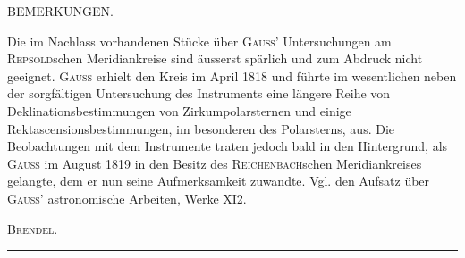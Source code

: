 \begin{center}BEMERKUNGEN.\end{center}
\begingroup\small
\noindent\hspace*{\parindent}Die im Nachlass vorhandenen Stücke über \textsc{Gauss}’ Untersuchungen am \textsc{Repsold}schen Meridiankreise sind äusserst spärlich und zum Abdruck nicht geeignet. \textsc{Gauss} erhielt den Kreis im April 1818 und führte im wesentlichen neben der sorgfältigen Untersuchung des Instruments eine längere Reihe von Deklinationsbestimmungen von Zirkumpolarsternen und einige Rektascensionsbestimmungen, im besonderen des Polarsterns, aus. Die Beobachtungen mit dem Instrumente traten jedoch bald in den Hintergrund, als \textsc{Gauss} im August 1819 in den Besitz des \textsc{Reichenbach}schen Meridiankreises gelangte, dem er nun seine Aufmerksamkeit zuwandte. Vgl. den Aufsatz über \textsc{Gauss}’ astronomische Arbeiten, Werke XI2.
\begin{flushright}\textsc{Brendel}.\end{flushright}
\begin{center}\rule{.24\textwidth}{.3pt}\end{center}
\par\endgroup
\clearpage\endgroup
